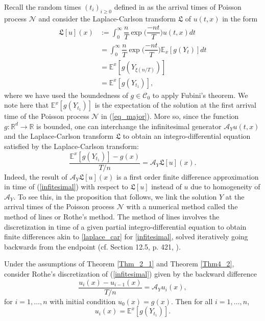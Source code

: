 Recall the random times $(t_i)_{i \geq 0}$ defined in  as the arrival times of Poisson process $\mathcal{N}$ and consider the Laplace-Carlson transform $\mathfrak{L}$ of $u(t, x)$ in the form
\begin{equation}\label{MOL}
    \begin{split}
        \mathfrak{L}[u](x) &:= \int_0^\infty \dfrac{n}{T} \exp{\big(\dfrac{-nt}{T} \big)}u(t, x) dt\\
        &= \int_0^\infty \dfrac{n}{T} \exp{\big(\dfrac{-nt}{T} \big)}\mathbb{E}_x[g (Y_t)] dt\\
        &= \mathbb{E}^x[g (Y_{\xi(n/T)})]\\
        &= \mathbb{E}^x[g (Y_{t_1})],
    \end{split}
\end{equation}
where we have used the boundedness of $g \in \mathcal{C}_0$ to apply Fubini's theorem. We note here that $\mathbb{E}^x[g (Y_{t_1})]$ is the expectation of the solution at the first arrival time of the Poisson process $\mathcal{N}$ in (\ref{eq_major}). More so, since the function $g :\mathbb{R}^d \to \mathbb{R}$ is bounded, one can interchange the infinitesimal generator $\mathcal{A}_Y u(t, x)$ and  the Laplace-Carlson transform $\mathfrak{L}$ to obtain an integro-differential equation satisfied by the  Laplace-Carlson transform:
\begin{equation}\label{laplace_car}
    \dfrac{\mathbb{E}^x[g (Y_{t_1})] - g(x)}{T/n} = \mathcal{A}_Y\mathfrak{L}[u](x).
\end{equation}
Indeed, the result of $\mathcal{A}_Y\mathfrak{L}[u](x)$ is a first order finite difference approximation in time of (\ref{infitesimal}) with respect to $\mathfrak{L}[u]$ instead of $u$ due to homogeneity of $\mathcal{A}_Y$. To see this, in the proposition that follows, we link the solution $Y$ at the arrival times of the Poisson process $\mathcal{N}$ with a numerical method called the method of lines or Rothe's method. The method of lines involves the discretization in time of a given partial integro-differential equation to obtain finite differences akin to \eqref{laplace_car} for \eqref{infitesimal}, solved iteratively going backwards from the endpoint (cf. Section 12.5, p. 421, ).
\begin{proposition}\label{Prop_backward_diff}
Under the assumptions of Theorem \ref{Thm_2_1} and Theorem \ref{Thm4_2}, consider Rothe's discretization of  (\ref{infitesimal}) given by the backward difference
\begin{equation}\label{backward_diff}
    \dfrac{u_i(x)-u_{i-1}(x)}{T/n} = \mathcal{A}_Y u_i(x),
\end{equation}
for $i = 1, \ldots, n$ with initial condition $u_0(x) = g(x)$. Then for all $i = 1, \ldots, n$,
\begin{equation*}
    u_i(x) = \mathbb{E}^x[g (Y_{t_1})].
\end{equation*}
\end{proposition}


